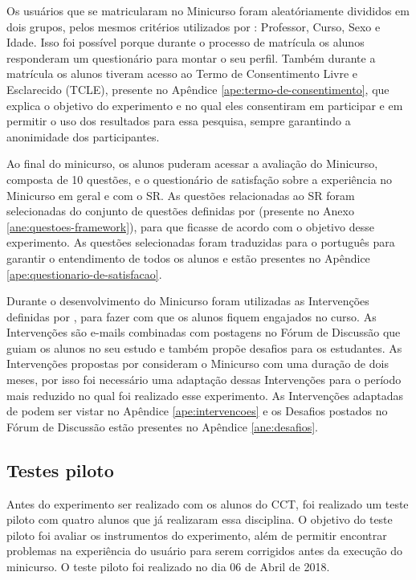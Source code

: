 Os usuários que se matricularam no Minicurso foram aleatóriamente divididos em dois grupos, pelos mesmos critérios
utilizados por : Professor, Curso, Sexo e Idade. Isso foi possível porque durante o processo de
matrícula os alunos responderam um questionário para montar o seu perfil. Também durante a matrícula os alunos tiveram
acesso ao Termo de Consentimento Livre e Esclarecido (TCLE), presente no Apêndice \ref{ape:termo-de-consentimento}, que
explica o objetivo do experimento e no qual eles consentiram em participar e em permitir o uso dos
resultados para essa pesquisa, sempre garantindo a anonimidade dos participantes.

Ao final do minicurso, os alunos puderam acessar a avaliação do Minicurso, composta de 10 questões, e o questionário
de satisfação sobre a experiência no Minicurso em geral e com o SR. As questões relacionadas ao SR foram selecionadas do
conjunto de questões definidas por  (presente no Anexo \ref{ane:questoes-framework}), para que
ficasse de acordo com o objetivo desse experimento. As questões selecionadas foram traduzidas para o português para garantir o entendimento de todos os alunos
e estão presentes no Apêndice \ref{ape:questionario-de-satisfacao}.

Durante o desenvolvimento do Minicurso foram utilizadas as Intervenções definidas por , para
fazer com que os alunos fiquem engajados no curso. As Intervenções são e-mails combinadas com postagens no Fórum de Discussão
que guiam os alunos no seu estudo e também propõe desafios para os estudantes. As Intervenções propostas por 
consideram o Minicurso com uma duração de dois meses, por isso foi necessário uma adaptação dessas Intervenções para o período
mais reduzido no qual foi realizado esse experimento. As Intervenções adaptadas de  podem
ser vistar no Apêndice \ref{ape:intervencoes} e os Desafios postados no Fórum de Discussão estão presentes no Apêndice \ref{ane:desafios}.

\subsection{Testes piloto}\label{section:planejamento-teste-piloto}

Antes do experimento ser realizado com os alunos do CCT, foi realizado um teste piloto com
quatro alunos que já realizaram essa disciplina. O objetivo do teste piloto foi avaliar os instrumentos do experimento,
além de permitir encontrar problemas na experiência do usuário para serem corrigidos antes da execução do minicurso. O teste piloto
foi realizado no dia 06 de Abril de 2018.

